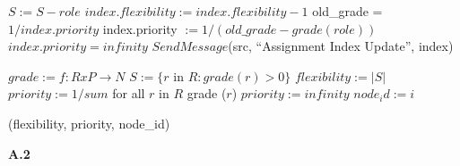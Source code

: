 \documentclass[11pt]{article}
\begin{document}
\begin{algorithmic}
		\State $S := S - role$
		\State $index.flexibility := index.flexibility - 1$
			\State old\_grade = $1 / index.priority$
			\State index.priority $:= 1 / (old\_grade - grade(role))$
		\Else
			\State $index.priority = infinity$
		\EndIf
	\EndIf
	\State $SendMessage$(src, ``Assignment Index Update'', index)
\EndFunction
\end{algorithmic}

\begin{algorithmic}
	\State $grade :=  f: R x P \rightarrow N$
	\State $S := \{r$ in $R :  grade (r) > 0\}$
        \State $flexibility := | S |$
        		\State $priority := 1 / sum$ for all $r$ in $R$ grade ($r$)
	\Else
		\State $ priority := infinity$
        \EndIf
        \State $node_id := i$

	\Return (flexibility, priority, node\_id)
\EndFunction
\end{algorithmic}

\begin{center}
\large{\textbf{A.2}}
\end{center}
\end{document}
